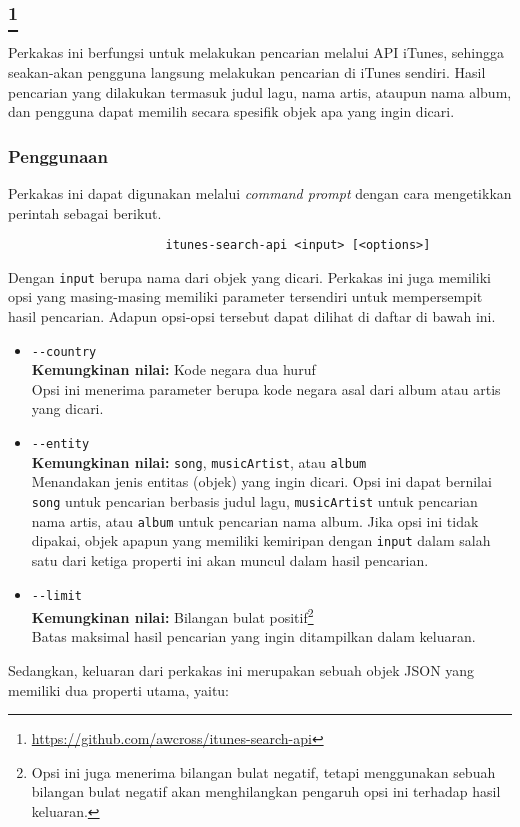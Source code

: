 \subsection{\itunesapi\footnote{\href{https://github.com/awcross/itunes-search-api}{https://github.com/awcross/itunes-search-api}}}
\label{sec:similarapps-itunesapi}

Perkakas \cl ini berfungsi untuk melakukan pencarian melalui API iTunes, sehingga seakan-akan pengguna langsung melakukan pencarian di iTunes sendiri. Hasil pencarian yang dilakukan termasuk judul lagu, nama artis, ataupun nama album, dan pengguna dapat memilih secara spesifik objek apa yang ingin dicari.

\subsubsection{Penggunaan}
\label{sec:similarapps-itunesapi-usage}

Perkakas ini dapat digunakan melalui \textit{command prompt} dengan cara mengetikkan perintah sebagai berikut.

\begin{verbatim}
                      itunes-search-api <input> [<options>]
\end{verbatim}

Dengan \verb|input| berupa nama dari objek yang dicari. Perkakas ini juga memiliki opsi yang masing-masing memiliki parameter tersendiri untuk mempersempit hasil pencarian. Adapun opsi-opsi tersebut dapat dilihat di daftar di bawah ini.

\begin{itemize}
	\item \verb|--country|\\
	\textbf{Kemungkinan nilai:} Kode negara dua huruf\\
	Opsi ini menerima parameter berupa kode negara asal dari album atau artis yang dicari.
	\item \verb|--entity|\\
	\textbf{Kemungkinan nilai:} \verb|song|, \verb|musicArtist|, atau \verb|album|\\
	Menandakan jenis entitas (objek) yang ingin dicari. Opsi ini dapat bernilai \verb|song| untuk pencarian berbasis judul lagu, \verb|musicArtist| untuk pencarian nama artis, atau \verb|album| untuk pencarian nama album. Jika opsi ini tidak dipakai, objek apapun yang memiliki kemiripan dengan \verb|input| dalam salah satu dari ketiga properti ini akan muncul dalam hasil pencarian.
	\item \verb|--limit|\\
	\textbf{Kemungkinan nilai:} Bilangan bulat positif\footnote{Opsi ini juga menerima bilangan bulat negatif, tetapi menggunakan sebuah bilangan bulat negatif akan menghilangkan pengaruh opsi ini terhadap hasil keluaran.}\\
	Batas maksimal hasil pencarian yang ingin ditampilkan dalam keluaran.
\end{itemize}
\vspace{\baselineskip}
Sedangkan, keluaran dari perkakas ini merupakan sebuah objek JSON yang memiliki dua properti utama, yaitu:

